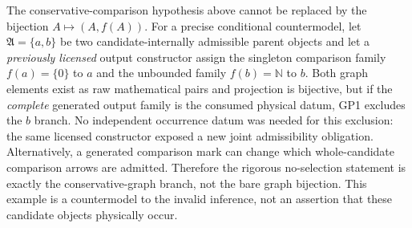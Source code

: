 \documentclass[12pt,a4paper]{article}
\begin{document}
\begin{remark}
\label{p2a:rem:v280-readout-graph-not-order-isomorphism}
The conservative-comparison hypothesis above cannot be replaced by the
bijection $A\mapsto(A,f(A))$.  For a precise conditional countermodel, let
$\mathfrak A=\{a,b\}$ be two candidate-internally admissible parent objects
and let a \emph{previously licensed} output constructor assign the singleton
comparison family $f(a)=\{0\}$ to $a$ and the unbounded family
$f(b)=\mathbb N$ to $b$.  Both graph elements exist as raw mathematical
pairs and projection is bijective, but if the \emph{complete} generated
output family is the consumed physical datum, GP1 excludes the $b$ branch.
No independent occurrence datum was needed for this exclusion: the same
licensed constructor exposed a new joint admissibility obligation.
Alternatively, a generated comparison mark can change which
whole-candidate comparison arrows are admitted.  Therefore the rigorous
no-selection statement is exactly the conservative-graph branch, not the
bare graph bijection.  This example is a countermodel to the invalid
inference, not an assertion that these candidate objects physically occur.
\end{remark}
\end{document}
